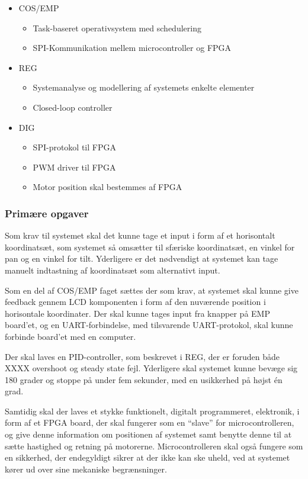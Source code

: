 \begin{itemize}[noitemsep]
	\item COS/EMP
	\begin{itemize}[noitemsep]
		\item Task-baseret operativsystem med schedulering
		\item SPI-Kommunikation mellem microcontroller og FPGA
	\end{itemize}
	\item REG
	\begin{itemize}[noitemsep]
		\item Systemanalyse og modellering af systemets enkelte elementer
		\item Closed-loop controller
	\end{itemize}
	\item DIG
	\begin{itemize}[noitemsep]
		\item SPI-protokol til FPGA
		\item PWM driver til FPGA
		\item Motor position skal bestemmes af FPGA
	\end{itemize}
\end{itemize}

\subsubsection{Primære opgaver}

Som krav til systemet skal det kunne tage et input i form af et horisontalt koordinatsæt, som systemet så omsætter til sfæriske koordinatsæt, en vinkel for pan og en vinkel for tilt. Yderligere er det nødvendigt at systemet kan tage manuelt indtastning af koordinatsæt som alternativt input.

Som en del af COS/EMP faget sættes der som krav, at systemet skal kunne give feedback gennem LCD komponenten i form af den nuværende position i horisontale koordinater. Der skal kunne tages input fra knapper på EMP board'et, og en UART-forbindelse, med tilsvarende UART-protokol, skal kunne forbinde board'et med en computer.

Der skal laves en PID-controller, som beskrevet i REG, der er foruden både XXXX overshoot og steady state fejl. Yderligere skal systemet kunne bevæge sig 180 grader og stoppe på under fem sekunder, med en usikkerhed på højst én grad.

Samtidig skal der laves et stykke funktionelt, digitalt programmeret, elektronik, i form af et FPGA board, der skal fungerer som en ``slave'' for microcontrolleren, og give denne information om positionen af systemet samt benytte denne til at sætte hastighed og retning på motorerne. Microcontrolleren skal også fungere som en sikkerhed, der endegyldigt sikrer at der ikke kan ske uheld, ved at systemet kører ud over sine mekaniske begrænsninger.

